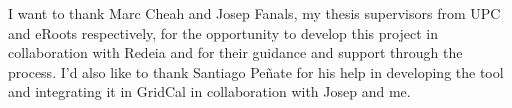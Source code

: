I want to thank Marc Cheah and Josep Fanals, my thesis supervisors from UPC and eRoots respectively, for the opportunity to develop this project in collaboration with Redeia and for their guidance and support through the process.
I'd also like to thank Santiago Peñate for his help in developing the tool and integrating it in GridCal in collaboration with Josep and me.